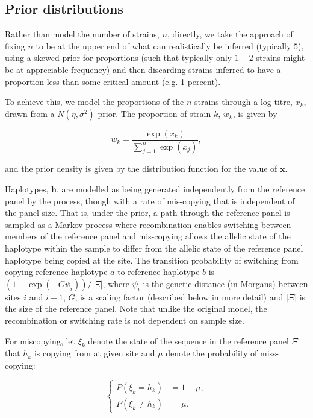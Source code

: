 \documentclass{nature}
\begin{document}
\subsection*{Prior distributions}\label{sec:prior}

Rather than model the number of strains, $n$, directly, we take the approach of fixing $n$ to be at the upper end of what can realistically be inferred (typically $5$), using a skewed prior for proportions (such that typically only $1-2$ strains might be at appreciable frequency) and then discarding strains inferred to have a proportion less than some critical amount (e.g. 1 percent).

To achieve this, we model the proportions of the $n$ strains through a log titre, $x_k$, drawn from a $N(\eta, \sigma^2)$ prior.  The proportion of strain $k$, $w_k$, is given by

\begin{equation}
w_k = \frac{\exp(x_k)}{\sum_{j=1}^n \exp(x_j)},
\end{equation}

\noindent and the prior density is given by the distribution function for the value of $\mathbf{x}$.

Haplotypes, $\mathbf{h}$, are modelled as being generated independently from the reference panel by the \cite{Li2003} process, though with a rate of mis-copying that is independent of the panel size. That is, under the prior, a path through the reference panel is sampled as a Markov process where recombination enables switching between members of the reference panel and mis-copying allows the allelic state of the haplotype within the sample to differ from the allelic state of the reference panel haplotype being copied at the site.  The transition probability of switching from copying reference haplotype $a$ to reference haplotype $b$ is $(1-\exp(-G \psi_i))/|\Xi|$, where $\psi_i$ is the genetic distance (in Morgans) between sites $i$ and $i+1$, $G$, is a scaling factor (described below in more detail) and $|\Xi|$ is the size of the reference panel.  Note that unlike the original model, the recombination or switching rate is not dependent on sample size.


For miscopying, let $\xi_k$ denote the state of the sequence in the reference panel $\Xi$ that $h_k$ is copying from at given site and $\mu$ denote the probability of miss-copying:

$$
\begin{cases}
P(\xi_k = h_k) &= 1-\mu, \\
P(\xi_k \neq h_k) &= \mu.
\end{cases}
$$
\end{document}
